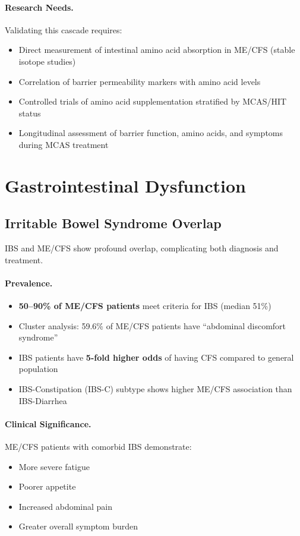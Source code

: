 \paragraph{Research Needs.}

Validating this cascade requires:
\begin{itemize}
    \item Direct measurement of intestinal amino acid absorption in ME/CFS (stable isotope studies)
    \item Correlation of barrier permeability markers with amino acid levels
    \item Controlled trials of amino acid supplementation stratified by MCAS/HIT status
    \item Longitudinal assessment of barrier function, amino acids, and symptoms during MCAS treatment
\end{itemize}

\section{Gastrointestinal Dysfunction}
\label{sec:gi-dysfunction}

\subsection{Irritable Bowel Syndrome Overlap}

IBS and ME/CFS show profound overlap, complicating both diagnosis and treatment.

\paragraph{Prevalence.}
\begin{itemize}
    \item \textbf{50--90\% of ME/CFS patients} meet criteria for IBS (median 51\%)
    \item Cluster analysis: 59.6\% of ME/CFS patients have ``abdominal discomfort syndrome''
    \item IBS patients have \textbf{5-fold higher odds} of having CFS compared to general population
    \item IBS-Constipation (IBS-C) subtype shows higher ME/CFS association than IBS-Diarrhea
\end{itemize}

\paragraph{Clinical Significance.}
ME/CFS patients with comorbid IBS demonstrate:
\begin{itemize}
    \item More severe fatigue
    \item Poorer appetite
    \item Increased abdominal pain
    \item Greater overall symptom burden
\end{itemize}

